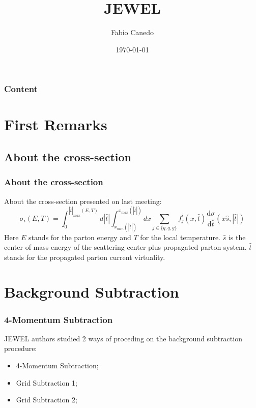 \documentclass{beamer}
\title[JEWEL]{JEWEL}
\institute[HEPIC-Instituto de Física]{HEPIC-Instituto de Física}
\author{Fabio Canedo}
\date{\today}
\newcommand*\titleTOC{Content}
\begin{document}
{
\usebackgroundtemplate{}%
\frame{\titlepage}
}

{
\begin{frame}\frametitle{\titleTOC}
	\tableofcontents
\end{frame}
}

\section{First Remarks}
\subsection{About the cross-section}

\begin{frame}\frametitle{About the cross-section}

	About the cross-section presented on last meeting:
	\pause
	\begin{equation}
	\sigma_i(E,T)=\int_{0}^{|\hat{t}|_{max}(E,T)}d|\hat{t}|\int_{x_{min}(|\hat{t}|)}^{x_{max}(|\hat{t}|)} dx \sum_{j \in \{ q,\overline{q},g\}} f_{j}^{i}(x,\hat{t})\frac{\mathrm{d}\sigma}{\mathrm{d}\hat{t}}(x\hat{s},|\hat{t}|)
	\end{equation}
	\pause
	Here $E$ stands for the parton energy and $T$ for the local temperature.
	$\hat{s}$ is the center of mass energy of the scattering center plus propagated parton system.
	$\hat{t}$ stands for the propagated parton current virtuality.
\end{frame}

\section{Background Subtraction}

\begin{frame}\frametitle{4-Momentum Subtraction}

	JEWEL authors studied 2 ways of proceding on the background subtraction procedure:
	\begin{itemize}
		\item 4-Momentum Subtraction;
		\item Grid Subtraction 1;
		\item Grid Subtraction 2;
	\end{itemize}

\end{frame}
\end{document}
